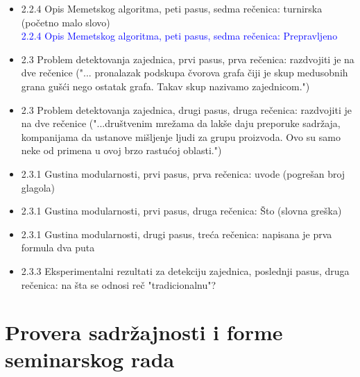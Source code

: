 \documentclass[a4paper]{report}
\newcommand{\odgovor}[1]{\textcolor{blue}{#1}}
\begin{document}
\begin{itemize}
    
    
    \item 2.2.4 Opis Memetskog algoritma, peti pasus, sedma rečenica: turnirska (početno malo slovo) \\ 
     \odgovor{ 2.2.4 Opis Memetskog algoritma, peti pasus, sedma rečenica: Prepravljeno \\}
     
     
    
    \item 2.3 Problem detektovanja zajednica, prvi pasus, prva rečenica: razdvojiti je na dve rečenice ("... pronalazak podskupa čvorova grafa čiji je skup medusobnih grana gušći nego ostatak grafa. Takav skup nazivamo zajednicom.")
    \item 2.3 Problem detektovanja zajednica, drugi pasus, druga rečenica: razdvojiti je na dve rečenice ("...društvenim mrežama da lakše daju preporuke sadržaja, kompanijama da ustanove mišljenje ljudi za grupu proizvoda. Ovo su samo neke od primena u ovoj brzo rastućoj oblasti.")
    \item 2.3.1 Gustina modularnosti, prvi pasus, prva rečenica: uvode (pogrešan broj glagola)
    \item 2.3.1 Gustina modularnosti, prvi pasus, druga rečenica: Što (slovna greška)
    \item 2.3.1 Gustina modularnosti, drugi pasus, treća rečenica: napisana je prva formula dva puta
    \item 2.3.3 Eksperimentalni rezultati za detekciju zajednica, poslednji pasus, druga rečenica: na šta se odnosi reč "tradicionalnu"?
\end{itemize}


\section{Provera sadržajnosti i forme seminarskog rada}
\end{document}
